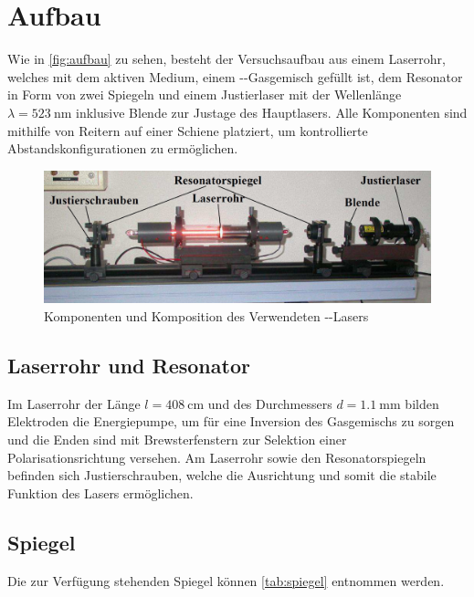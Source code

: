 \section{Aufbau}\label{sec:aufbau}
Wie in \autoref{fig:aufbau} zu sehen, besteht der Versuchsaufbau aus einem Laserrohr, welches mit dem aktiven Medium, einem --Gasgemisch gefüllt ist, dem Resonator in Form von zwei Spiegeln und einem Justierlaser mit der Wellenlänge $\lambda=\SI{523}{\nano\meter}$ inklusive Blende zur Justage des Hauptlasers. Alle Komponenten sind mithilfe von Reitern auf einer Schiene platziert, um kontrollierte Abstandskonfigurationen zu ermöglichen.

\begin{figure}[H]
    \centering
    \includegraphics[scale=0.5]{Ressourcen/aufbau.png}
    \caption{Komponenten und Komposition des Verwendeten --Lasers\cite{anleitung}}\label{fig:aufbau}
\end{figure}

\subsection{Laserrohr und Resonator}
Im Laserrohr der Länge $l=\SI{408}{\centi\meter}$ und des Durchmessers $d = \SI{1.1}{\milli\meter}$ bilden Elektroden die Energiepumpe, um für eine Inversion des Gasgemischs zu sorgen und die Enden sind mit Brewsterfenstern zur Selektion einer Polarisationsrichtung versehen. Am Laserrohr sowie den Resonatorspiegeln befinden sich Justierschrauben, welche die Ausrichtung und somit die stabile Funktion des Lasers ermöglichen.

\subsection{Spiegel}
Die zur Verfügung stehenden Spiegel können \autoref{tab:spiegel} entnommen werden.

